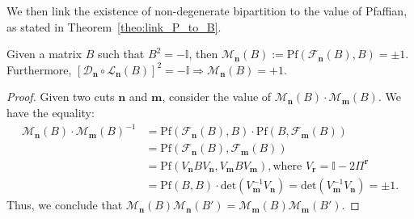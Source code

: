 We then link the existence of non-degenerate bipartition to the value of Pfaffian, as stated in Theorem~\ref{theo:link_P_to_B}.
\begin{theorem}\label{theo:link_P_to_B}
    Given a matrix $B$ such that  $B^2 = -\mathbb{I}$, then $ \mathcal{M}_{\mathbf n}(B) := \text{Pf}(\mathcal{F}_{\mathbf n}(B),B) = \pm 1$. Furthermore, $[\mathcal{D}_{\mathbf{n}}\circ \mathcal{L}_{\mathbf n}(B)]^2 = - \mathbb{I} \Rightarrow \mathcal{M}_{\mathbf{n}}(B) = +1$. 
\end{theorem}
\begin{proof}
    Given two cuts $\mathbf{n}$ and $\mathbf{m}$, consider the value of  $\mathcal{M}_{\mathbf n}(B) \cdot \mathcal{M}_{\mathbf m}(B)$. We have the equality:
    \begin{align}
        \mathcal{M}_{\mathbf n}(B) \cdot \mathcal{M}_{\mathbf m}(B)^{-1}&=\text{Pf}(\mathcal{F}_{\mathbf n}(B),B) \cdot \text{Pf}(B,\mathcal{F}_{\mathbf m}(B))\\
        &=\text{Pf}(\mathcal{F}_{\mathbf n}(B),\mathcal{F}_{\mathbf m}(B))\\
        &=\text{Pf}(V_{\mathbf n}BV_{\mathbf n},V_{\mathbf m}B V_{\mathbf m}),\text{where~} V_{\mathbf{r}} = \mathbb I - 2\Pi^{\mathbf{r} }\\
        &= \text{Pf}(B,B ) \cdot \text{det}(V_{\mathbf m}^{-1}V_{\mathbf n}) =\text{det}(V_{\mathbf m}^{-1}V_{\mathbf n}) = \pm 1.
    \end{align}
    Thus, we conclude that $\mathcal{M}_{\mathbf{n}}(B) \mathcal{M}_{\mathbf{n}}(B') = \mathcal{M}_{\mathbf{m}}(B) \mathcal{M}_{\mathbf{m}}(B')$. 
    

\end{proof}
